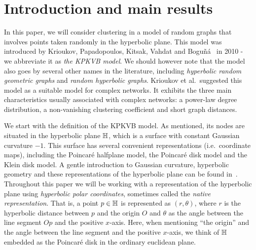\section{Introduction and main results}



In this paper, we will consider clustering in a model of random graphs that involves points taken randomly in the hyperbolic plane. This model was introduced by Krioukov, Papadopoulos, Kitsak, Vahdat and Bogu\~{n}\'a~\cite{krioukov2010hyperbolic} in 
2010 - we abbreviate it as \emph{the KPKVB model}. We should however note that the model also goes by several other names in the literature, including {\em hyperbolic random geometric graphs} and {\em random hyperbolic graphs}. Krioukov et al.~suggested this model as a suitable model for complex networks. It exhibits the three main characteristics usually associated with complex networks: a power-law degree distribution, a non-vanishing clustering coefficient and short graph distances.

%

We start with the definition of the KPKVB model. %
As mentioned, its nodes are situated in the hyperbolic plane ${\mathbb H}$, which is a surface with constant Gaussian curvature $-1$. This surface has several convenient representations (i.e.~coordinate maps), including the Poincar\'e halfplane model, the Poincar\'e disk model and the Klein disk model. A gentle introduction to Gaussian curvature, hyperbolic geometry and these representations of the hyperbolic plane can be found in~\cite{stillwellboek}. Throughout this paper we will be working with a representation of the hyperbolic plane using {\em hyperbolic polar coordinates}, sometimes called the {\em native representation}. That is, a point $p \in {\mathbb H}$ is represented as $(r,\theta)$, where $r$ is the hyperbolic distance between $p$ and the origin $O$ and $\theta$ as the angle between the line segment $Op$ and the positive $x$-axis. 
Here, when mentioning ``the origin'' and the angle between the line segment and the positive $x$-axis, we think of ${\mathbb H}$ embedded as the Poincar\'e disk in the ordinary euclidean plane.

